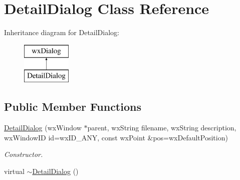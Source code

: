 \hypertarget{class_detail_dialog}{\section{Detail\-Dialog Class Reference}
\label{class_detail_dialog}
}
Inheritance diagram for Detail\-Dialog\-:\begin{figure}[H]
\begin{center}
\leavevmode
\includegraphics[height=2.000000cm]{class_detail_dialog}
\end{center}
\end{figure}
\subsection*{Public Member Functions}
\begin{DoxyCompactItemize}
\item 
\hyperlink{class_detail_dialog_afd8f2713c0edd1b672227cda0f6b9d54}{Detail\-Dialog} (wx\-Window $\ast$parent, wx\-String filename, wx\-String description, wx\-Window\-I\-D id=wx\-I\-D\-\_\-\-A\-N\-Y, const wx\-Point \&pos=wx\-Default\-Position)
\begin{DoxyCompactList}\small\item\em Constructor. \end{DoxyCompactList}\item 
virtual \hyperlink{class_detail_dialog_abbee914db783bd3207a1697e1f41eef2}{$\sim$\-Detail\-Dialog} ()
\end{DoxyCompactItemize}
